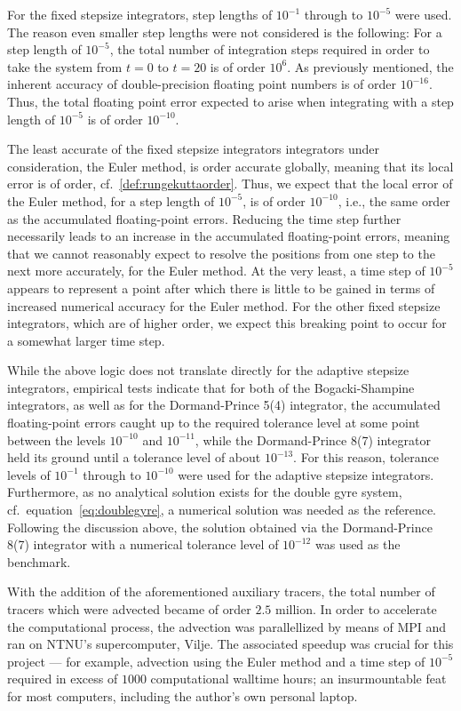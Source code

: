 For the fixed stepsize integrators, step lengths of $10^{-1}$ through to
$10^{-5}$ were used. The reason even smaller step lengths were not considered
is the following: For a step length of $10^{-5}$, the total number of
integration steps required in order to take the system from $t=0$ to $t=20$
is of order $10^{6}$. As previously mentioned, the inherent accuracy of
double-precision floating point numbers is of order $10^{-16}$. Thus, the
total floating point error expected to arise when integrating with a step
length of $10^{-5}$ is of order $10^{-10}$.

The least accurate of the fixed stepsize integrators integrators under
consideration, the Euler method, is  order accurate globally, meaning
that its local error is of  order, cf.\
\cref{def:rungekuttaorder}. Thus, we expect that the local error of the Euler
method, for a step length of $10^{-5}$, is of order $10^{-10}$, i.e., the
same order as the accumulated floating-point errors. Reducing the time step
further necessarily leads to an increase in the accumulated floating-point
errors, meaning that we cannot reasonably expect to resolve the positions
from one step to the next more accurately, for the Euler method. At the very
least, a time step of $10^{-5}$ appears to represent a point after which
there is little to be gained in terms of increased numerical accuracy for the
Euler method. For the other fixed stepsize integrators, which are of higher
order, we expect this breaking point to occur for a somewhat larger time step.

While the above logic does not translate directly for the adaptive stepsize
integrators, empirical tests indicate that for both of the Bogacki-Shampine
integrators, as well as for the Dormand-Prince 5(4) integrator, the accumulated
floating-point errors caught up to the required tolerance level at some point
between the levels $10^{-10}$ and $10^{-11}$, while the Dormand-Prince 8(7)
integrator held its ground until a tolerance level of about $10^{-13}$. For this
reason, tolerance levels of $10^{-1}$ through to $10^{-10}$ were used for the
adaptive stepsize integrators. Furthermore, as no analytical solution exists
for the double gyre system, cf.\ equation~\eqref{eq:doublegyre}, a numerical
solution was needed as the reference. Following the discussion above, the
solution obtained via the Dormand-Prince 8(7) integrator with a numerical
tolerance level of $10^{-12}$ was used as the benchmark.

With the addition of the aforementioned auxiliary tracers, the total number
of tracers which were advected became of order $2.5$ million. In order to
accelerate the computational process, the advection was parallellized by means
of MPI and ran on NTNU's supercomputer, Vilje. The associated speedup was
crucial for this project --- for example, advection using the Euler method
and a time step of $10^{-5}$ required in excess of $1000$ computational
walltime hours; an insurmountable feat for most computers, including the
author's own personal laptop.
